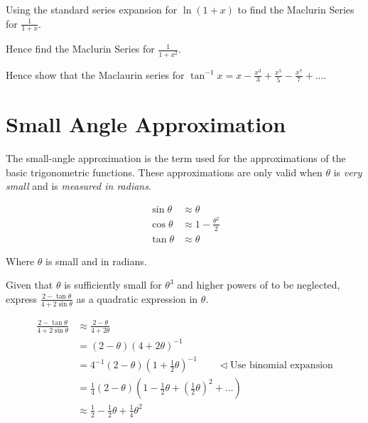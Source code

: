 \documentclass[11pt,a4paper]{book}
\begin{document}
\begin{example}

Using the standard series expansion for $\ln\left(1+x\right)$ to
find the Maclurin Series for ${\displaystyle \frac{1}{1+x}}$.

Hence find the Maclurin Series for ${\displaystyle \frac{1}{1+x^{2}}}$.

Hence show that the Maclaurin series for ${\displaystyle \tan^{-1}x=x-\frac{x^{3}}{3}+\frac{x^{5}}{5}-\frac{x^{7}}{7}+\ldots}$.

\Solution

\end{example}

\newpage

\section{Small Angle Approximation}

The small-angle approximation is the term used for the approximations
of the basic trigonometric functions. These approximations are only
valid when $\theta$ is \textit{very small} and is \textit{measured
in radians}.

\begin{tcolorbox}[colback=blue!5, colframe=black, boxrule=.4pt, sharpish corners]

\begin{align*}
\sin\theta & \approx\theta\\
\cos\theta & \approx1-\frac{\theta^{2}}{2}\\
\tan\theta & \approx\theta
\end{align*}

Where $\theta$ is small and in radians.
\end{tcolorbox}


\begin{example}

Given that $\theta$ is sufficiently small for $\theta^{3}$ and higher
powers of to be neglected, express ${\displaystyle \frac{2-\tan\theta}{4+2\sin\theta}}$
as a quadratic expression in $\theta$.

\Solution

\begin{align*}
\frac{2-\tan\theta}{4+2\sin\theta} & \approx\frac{2-\theta}{4+2\theta}\\
 & =\left(2-\theta\right)\left(4+2\theta\right)^{-1}\\
 & =4^{-1}\left(2-\theta\right)\left(1+\frac{1}{2}\theta\right)^{-1}\qquad\triangleleft\text{Use binomial expansion}\\
 & =\frac{1}{4}\left(2-\theta\right)\left(1-\frac{1}{2}\theta+\left(\frac{1}{2}\theta\right)^{2}+\ldots\right)\\
 & \approx\frac{1}{2}-\frac{1}{2}\theta+\frac{1}{4}\theta^{2}
\end{align*}

\end{example}
\end{document}
